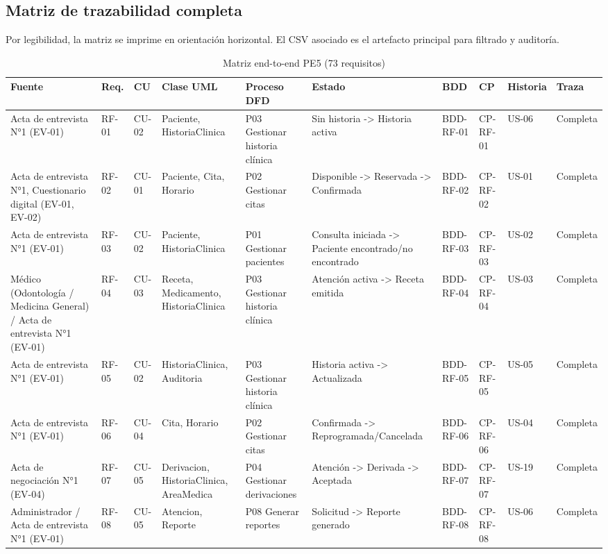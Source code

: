 \documentclass[11pt,a4paper]{article}
\begin{document}
\begin{appendices}
		\subsection{Matriz de trazabilidad completa}
		Por legibilidad, la matriz se imprime en orientación horizontal. El CSV asociado es el artefacto principal para filtrado y auditoría.
		\begin{landscape}\scriptsize
			\begin{longtable}{p{2.2cm}p{1.8cm}p{2cm}p{3cm}p{3cm}p{3cm}p{2cm}p{2cm}p{2cm}p{1.6cm}}
				\caption{Matriz end-to-end PE5 (73 requisitos)}\\\toprule
				\textbf{Fuente}&\textbf{Req.}&\textbf{CU}&\textbf{Clase UML}&\textbf{Proceso DFD}&\textbf{Estado}&\textbf{BDD}&\textbf{CP}&\textbf{Historia}&\textbf{Traza}\\\midrule\endhead
				Acta de entrevista N°1 (EV-01) & RF-01 & CU-02 & Paciente, HistoriaClinica & P03 Gestionar historia clínica & Sin historia -> Historia activa & BDD-RF-01 & CP-RF-01 & US-06 & Completa\\
				Acta de entrevista N°1, Cuestionario digital (EV-01, EV-02) & RF-02 & CU-01 & Paciente, Cita, Horario & P02 Gestionar citas & Disponible -> Reservada -> Confirmada & BDD-RF-02 & CP-RF-02 & US-01 & Completa\\
				Acta de entrevista N°1 (EV-01) & RF-03 & CU-02 & Paciente, HistoriaClinica & P01 Gestionar pacientes & Consulta iniciada -> Paciente encontrado/no encontrado & BDD-RF-03 & CP-RF-03 & US-02 & Completa\\
				Médico (Odontología / Medicina General) / Acta de entrevista N°1 (EV-01) & RF-04 & CU-03 & Receta, Medicamento, HistoriaClinica & P03 Gestionar historia clínica & Atención activa -> Receta emitida & BDD-RF-04 & CP-RF-04 & US-03 & Completa\\
				Acta de entrevista N°1 (EV-01) & RF-05 & CU-02 & HistoriaClinica, Auditoria & P03 Gestionar historia clínica & Historia activa -> Actualizada & BDD-RF-05 & CP-RF-05 & US-05 & Completa\\
				Acta de entrevista N°1 (EV-01) & RF-06 & CU-04 & Cita, Horario & P02 Gestionar citas & Confirmada -> Reprogramada/Cancelada & BDD-RF-06 & CP-RF-06 & US-04 & Completa\\
				Acta de negociación N°1 (EV-04) & RF-07 & CU-05 & Derivacion, HistoriaClinica, AreaMedica & P04 Gestionar derivaciones & Atención -> Derivada -> Aceptada & BDD-RF-07 & CP-RF-07 & US-19 & Completa\\
				Administrador / Acta de entrevista N°1 (EV-01) & RF-08 & CU-05 & Atencion, Reporte & P08 Generar reportes & Solicitud -> Reporte generado & BDD-RF-08 & CP-RF-08 & US-06 & Completa\\

\end{longtable}
\end{landscape}
\end{appendices}
\end{document}
